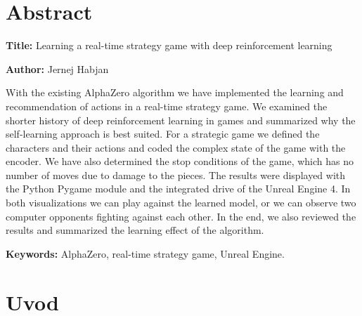 \documentclass[a4paper, 12pt]{book}
\newcommand{\ttitleEn}{Learning a real-time strategy game with deep reinforcement learning}
\newcommand{\tauthor}{Jernej Habjan}
\newcommand{\tkeywordsEn}{AlphaZero, real-time strategy game, Unreal Engine}
\newcommand{\clearemptydoublepage}{\newpage{\pagestyle{empty}\cleardoublepage}}
\begin{document}
\chapter*{Abstract}

\noindent\textbf{Title:} \ttitleEn
\bigskip

\noindent\textbf{Author:} \tauthor
\bigskip

\noindent With the existing AlphaZero algorithm we have implemented the learning and recommendation of actions in a real-time strategy game.
We examined the shorter history of deep reinforcement learning in games and summarized why the self-learning approach is best suited.
For a strategic game we defined the characters and their actions and coded the complex state of the game with the encoder.
We have also determined the stop conditions of the game, which has no number of moves due to damage to the pieces.
The results were displayed with the Python Pygame module and the integrated drive of the Unreal Engine 4.
In both visualizations we can play against the learned model, or we can observe two computer opponents fighting against each other.
In the end, we also reviewed the results and summarized the learning effect of the algorithm.
\bigskip

\noindent\textbf{Keywords:} \tkeywordsEn.
\clearemptydoublepage

\mainmatter
\setcounter{page}{1}
\pagestyle{fancy}


\chapter{Uvod}
\end{document}
